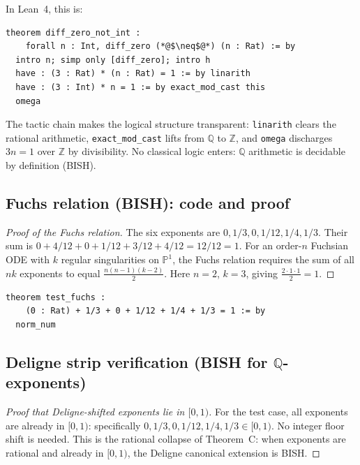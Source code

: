 \documentclass[11pt,a4paper]{article}
\theoremstyle{plain}
\theoremstyle{definition}
\newcommand{\BISH}{\textsf{BISH}}
\newcommand{\Z}{\mathbb{Z}}
\newcommand{\Q}{\mathbb{Q}}
\newcommand{\PP}{\mathbb{P}}
\begin{document}
\noindent
In Lean~4, this is:

\begin{tcolorbox}[leanbox={Non-resonance at z=0 -- RHData.lean}]
\begin{lstlisting}[style=leanstyle]
theorem diff_zero_not_int :
    forall n : Int, diff_zero (*@$\neq$@*) (n : Rat) := by
  intro n; simp only [diff_zero]; intro h
  have : (3 : Rat) * (n : Rat) = 1 := by linarith
  have : (3 : Int) * n = 1 := by exact_mod_cast this
  omega
\end{lstlisting}
\end{tcolorbox}

The tactic chain makes the logical structure transparent: \texttt{linarith} clears the rational arithmetic, \texttt{exact\_mod\_cast} lifts from $\Q$ to $\Z$, and \texttt{omega} discharges $3n = 1$ over $\Z$ by divisibility.
No classical logic enters: $\Q$ arithmetic is decidable by definition (\BISH).

\subsection{Fuchs relation (\BISH): code and proof}

\begin{proof}[Proof of the Fuchs relation]
The six exponents are $0, 1/3, 0, 1/12, 1/4, 1/3$.
Their sum is $0 + 4/12 + 0 + 1/12 + 3/12 + 4/12 = 12/12 = 1$.
For an order-$n$ Fuchsian ODE with $k$ regular singularities on $\PP^1$, the Fuchs relation requires the sum of all $nk$ exponents to equal $\frac{n(n-1)(k-2)}{2}$.
Here $n = 2$, $k = 3$, giving $\frac{2 \cdot 1 \cdot 1}{2} = 1$.
\end{proof}

\begin{tcolorbox}[leanbox={Fuchs relation (Paper106\_RiemannHilbert.lean)}]
\begin{lstlisting}[style=leanstyle]
theorem test_fuchs :
    (0 : Rat) + 1/3 + 0 + 1/12 + 1/4 + 1/3 = 1 := by
  norm_num
\end{lstlisting}
\end{tcolorbox}

\subsection{Deligne strip verification (\BISH{} for $\Q$-exponents)}

\begin{proof}[Proof that Deligne-shifted exponents lie in $[0,1)$]
For the test case, all exponents are already in $[0,1)$: specifically $0, 1/3, 0, 1/12, 1/4, 1/3 \in [0,1)$.
No integer floor shift is needed.
This is the rational collapse of Theorem~C: when exponents are rational and already in $[0,1)$, the Deligne canonical extension is \BISH.
\end{proof}
\end{document}
